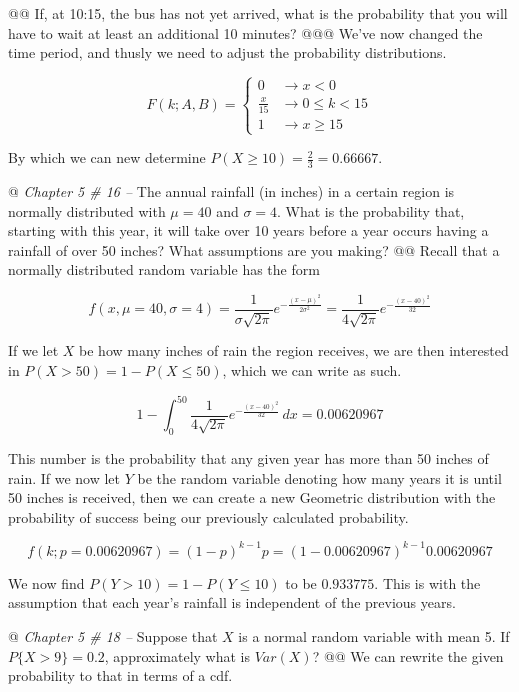 \documentclass[10pt]{article}
\begin{document}
\begin{easylist}[enumerate]
    @@ If, at 10:15, the bus has not yet arrived, what is the probability that you will have to wait at least an
    additional 10 minutes?
    @@@ We've now changed the time period, and thusly we need to adjust the probability distributions.

    \[
        F(k; A, B) =
        \begin{cases}
            0 &\to x < 0\\
            \frac{x}{15} &\to 0 \le k < 15\\
            1 &\to x \ge 15
        \end{cases}
    \]

    By which we can new determine $P(X \ge 10) = \frac{2}{3} = \boxed{0.66667}$.

    @ \textit{Chapter 5 \# 16 --} The annual rainfall (in inches) in a certain region is normally distributed with $\mu
    = 40$ and $\sigma = 4$. What is the probability that, starting with this year, it will take over 10 years before a
    year occurs having a rainfall of over 50 inches? What assumptions are you making?
    @@ Recall that a normally distributed random variable has the form

    \[
        f(x, \mu=40, \sigma=4) = \frac{1}{\sigma\sqrt{2\pi} } e^{-\frac{(x-\mu)^2}{2\sigma^2} } =
        \frac{1}{4\sqrt{2\pi} } e^{-\frac{(x-40)^2}{32} }
    \]

    If we let $X$ be how many inches of rain the region receives, we are then interested in $P(X > 50) = 1 - P(X \le
    50)$, which we can write as such.

    \[ 1 - \int^{50}_0 \frac{1}{4\sqrt{2\pi} } e^{-\frac{(x-40)^2}{32} } \, dx = 0.00620967 \]

    This number is the probability that any given year has more than 50 inches of rain. If we now let $Y$ be the random
    variable denoting how many years it is until 50 inches is received, then we can create a new Geometric distribution
    with the probability of success being our previously calculated probability.

    \[ f(k; p=0.00620967) = {(1 - p)}^{k-1} p = {(1 - 0.00620967)}^{k-1} 0.00620967 \]

    We now find $P(Y > 10) = 1 - P(Y \le 10)$ to be $\boxed{0.933775}$. This is with the assumption that each year's
    rainfall is independent of the previous years.

    @ \textit{Chapter 5 \# 18 --} Suppose that $X$ is a normal random variable with mean 5. If $P\{X > 9\} = 0.2$,
    approximately what is $Var(X)$?
    @@ We can rewrite the given probability to that in terms of a cdf.


\end{easylist}
\end{document}
